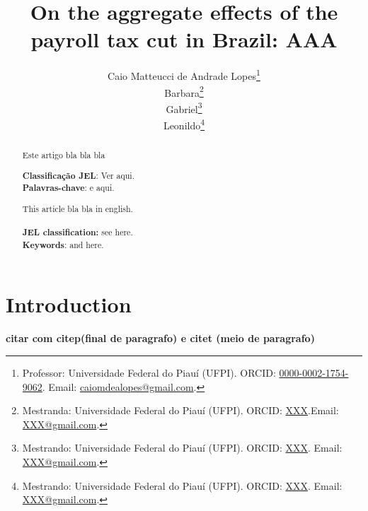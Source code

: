 \documentclass[12pt,a4paper,oneside]{article}
\date{}
\begin{document}
	\title{On the aggregate effects of the payroll tax cut in Brazil: AAA}

\author{
	Caio Matteucci de Andrade Lopes\thanks{Professor: Universidade Federal do Piauí (UFPI). ORCID: \href{https://orcid.org/0000-0002-1754-9062}{0000-0002-1754-9062}. Email: \href{mailto:caiomdealopes@gmail.com}{caiomdealopes@gmail.com}.} \\
	Barbara\thanks{Mestranda: Universidade Federal do Piauí (UFPI). ORCID: \href{https://XXX}{XXX}.Email: \href{mailto:XXX@gmail.com}{XXX@gmail.com}.} \\
	Gabriel\thanks{Mestrando: Universidade Federal do Piauí (UFPI). ORCID: \href{https://XXX}{XXX}. Email: \href{mailto:XXX@gmail.com}{XXX@gmail.com}.} \\
	Leonildo\thanks{Mestrando: Universidade Federal do Piauí (UFPI). ORCID: \href{https://XXX}{XXX}. Email: \href{mailto:XXX@gmail.com}{XXX@gmail.com}.}
}	
	\def \theforeigntitle{}
	
	\maketitle

\begin{abstract}

		 Este artigo bla bla bla
		 
		\textbf{Classificação JEL}: Ver aqui. \\
		\textbf {Palavras-chave}: e aqui.
\end{abstract}
	
		
		
\begin{abstract}
			This article bla bla in english.
		\\ \\
			 			 
		\textbf{JEL classification:} see here. \\
		\textbf {Keywords}: and here.
\end{abstract}

		
		
		\section{Introduction}
	
		\textbf{citar com citep(final de paragrafo) e citet (meio de paragrafo)}
\end{document}
